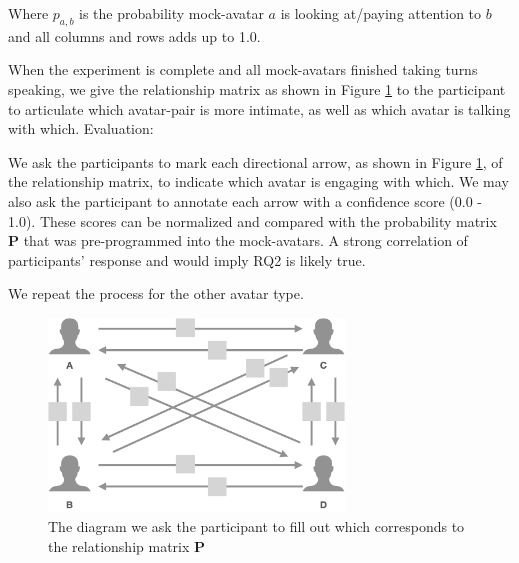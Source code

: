 Where $p_{a,b}$ is the probability mock-avatar $a$ is looking at/paying attention to $b$ and all columns and rows adds up to 1.0. 

When the experiment is complete and all mock-avatars finished taking turns speaking, we give the relationship matrix as shown in Figure \ref{fig:relmatrix} to the participant to articulate which avatar-pair is more intimate, as well as which avatar is talking with which.
Evaluation: 

We ask the participants to mark each directional arrow, as shown in Figure \ref{fig:relmatrix}, of the relationship matrix, to indicate which avatar is engaging with which. We may also ask the participant to annotate each arrow with a confidence score (0.0 - 1.0). These scores can be normalized and compared with the probability matrix $\mathbf P$ that was pre-programmed into the mock-avatars. A strong correlation of participants’ response and  would imply RQ2 is likely true.

We repeat the process for the other avatar type.

\begin{figure}
	\centering
 	\includegraphics[width=0.7\textwidth]{relmatrix.png}
	\caption{The diagram we ask the participant to fill out which corresponds to the relationship matrix $\mathbf P$}
	\label{fig:relmatrix}
\end{figure}


